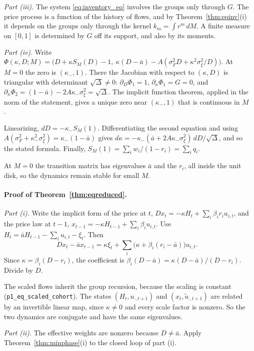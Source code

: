 \documentclass[12pt]{article}
\theoremstyle{definition}
\theoremstyle{remark}
\begin{document}
\emph{Part (iii).} The system \eqref{eq:inventory_eq} involves the groups only through $G$. The price process is a function of the history of flows, and by Theorem~\ref{thm:eqinv}(i) it depends on the groups only through the kernel $k_m=\int r^m\,dM$. A finite measure on $[0,1]$ is determined by $G$ off its support, and also by its moments.

\emph{Part (iv).} Write $\Phi(\kappa,D;M)=\bigl(D+\kappa S_M(D)-1,\ \kappa(D-\bar a)-A(\sigma_F^2D+\kappa^2\sigma_\xi^2/D)\bigr)$. At $M=0$ the zero is $(\kappa_-,1)$. There the Jacobian with respect to $(\kappa,D)$ is triangular with determinant $\sqrt\Delta\ne0$: $\partial_D\Phi_1=1$, $\partial_\kappa\Phi_1=G=0$, and $\partial_\kappa\Phi_2=(1-\bar a)-2A\kappa_-\sigma_\xi^2=\sqrt\Delta$. The implicit function theorem, applied in the norm of the statement, gives a unique zero near $(\kappa_-,1)$ that is continuous in $M$.

Linearizing, $dD=-\kappa_-S_M(1)$. Differentiating the second equation and using $A(\sigma_F^2+\kappa_-^2\sigma_\xi^2)=\kappa_-(1-\bar a)$ gives $d\kappa=-\kappa_-(\bar a+2A\kappa_-\sigma_\xi^2)\,dD/\sqrt\Delta$, and so the stated formula. Finally, $S_M(1)=\sum_iw_i/(1-r_i)=\sum_iq_i$.

At $M=0$ the transition matrix has eigenvalues $\bar a$ and the $r_i$, all inside the unit disk, so the dynamics remain stable for small $M$.

\paragraph{Proof of Theorem~\ref{thm:eqreduced}.}
\emph{Part (i).} Write the implicit form of the price at $t$, $Dx_t=-\kappa H_t+\sum_i\beta_ir_iu_{i,t}$, and the price law at $t-1$, $x_{t-1}=-\kappa H_{t-1}+\sum_i\beta_iu_{i,t}$. Use $H_t=\bar aH_{t-1}-\sum_iu_{i,t}-\xi_t$. Then
\[
 Dx_t-\bar ax_{t-1}=\kappa\xi_t+\sum_i\bigl(\kappa+\beta_i(r_i-\bar a)\bigr)u_{i,t}.
\]
Since $\kappa=\beta_i(D-r_i)$, the coefficient is $\beta_i(D-\bar a)=\kappa(D-\bar a)/(D-r_i)$. Divide by $D$.

The scaled flows inherit the group recursion, because the scaling is constant (\nolinkurl{p1_eq_scaled_cohort}). The states $(H_t,u_{\cdot,t+1})$ and $(x_t,\tilde u_{\cdot,t+1})$ are related by an invertible linear map, since $\kappa\ne0$ and every scale factor is nonzero. So the two dynamics are conjugate and have the same eigenvalues.

\emph{Part (ii).} The effective weights are nonzero because $D\ne\bar a$. Apply Theorem~\ref{thm:minphase}(i) to the closed loop of part (i).
\end{document}
